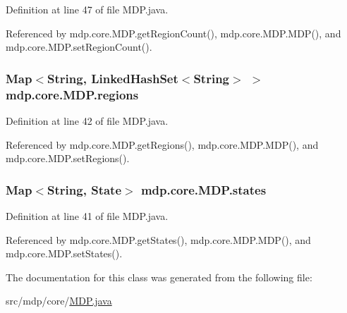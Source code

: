 Definition at line 47 of file M\+D\+P.\+java.



Referenced by mdp.\+core.\+M\+D\+P.\+get\+Region\+Count(), mdp.\+core.\+M\+D\+P.\+M\+D\+P(), and mdp.\+core.\+M\+D\+P.\+set\+Region\+Count().

\hypertarget{classmdp_1_1core_1_1_m_d_p_a79761e7b3bb0d7a083bee7183c992893}{}
\subsubsection[{regions}]{\setlength{\rightskip}{0pt plus 5cm}Map$<$String, Linked\+Hash\+Set$<$String$>$ $>$ mdp.\+core.\+M\+D\+P.\+regions\hspace{0.3cm}{\ttfamily [private]}}\label{classmdp_1_1core_1_1_m_d_p_a79761e7b3bb0d7a083bee7183c992893}


Definition at line 42 of file M\+D\+P.\+java.



Referenced by mdp.\+core.\+M\+D\+P.\+get\+Regions(), mdp.\+core.\+M\+D\+P.\+M\+D\+P(), and mdp.\+core.\+M\+D\+P.\+set\+Regions().

\hypertarget{classmdp_1_1core_1_1_m_d_p_a62bf7674d88162db7d00cfd82603b24f}{}
\subsubsection[{states}]{\setlength{\rightskip}{0pt plus 5cm}Map$<$String, {\bf State}$>$ mdp.\+core.\+M\+D\+P.\+states\hspace{0.3cm}{\ttfamily [private]}}\label{classmdp_1_1core_1_1_m_d_p_a62bf7674d88162db7d00cfd82603b24f}


Definition at line 41 of file M\+D\+P.\+java.



Referenced by mdp.\+core.\+M\+D\+P.\+get\+States(), mdp.\+core.\+M\+D\+P.\+M\+D\+P(), and mdp.\+core.\+M\+D\+P.\+set\+States().



The documentation for this class was generated from the following file\+:\begin{DoxyCompactItemize}
\item 
src/mdp/core/\hyperlink{_m_d_p_8java}{M\+D\+P.\+java}\end{DoxyCompactItemize}
